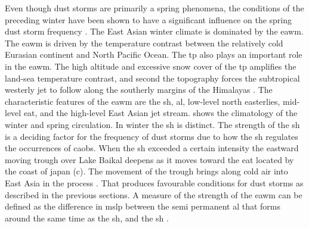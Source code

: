 Even though dust storms are primarily a spring phenomena, the conditions of the preceding winter have been shown to have a significant influence on the spring dust storm frequency \parencite{he2017impact, liu2018influence, gong2006simulated}. 
The East Asian winter climate is dominated by the \acrfull{eawm}. 
The \acrshort{eawm} is driven by the temperature contrast between the relatively cold Eurasian continent and North Pacific Ocean.
The \acrshort{tp} also plays an important role in the \acrshort{eawm}. 
The high altitude and excessive snow cover of the \acrshort{tp} amplifies the land-sea temperature contrast, and second the topography forces the subtropical westerly jet to follow along the southerly margins of the Himalayas \parencite{tada2016evolution}. 
The characteristic features of the \acrshort{eawm} are the \acrfull{sh}, \acrfull{al}, low-level north easterlies, mid-level \acrfull{eat}, and the high-level East Asian jet stream. 
 shows the climatology of the winter and spring  circulation. 
In winter the \acrshort{sh} is distinct. 
The strength of the \acrshort{sh} is a deciding factor for the frequency of dust storms due to how the \acrshort{sh} regulates the occurrences of \acrshort{caob}s.
When the \acrshort{sh} exceeded a certain intensity the eastward moving trough over Lake Baikal deepens as it moves toward the \acrshort{eat} located by the coast of japan (c). 
The movement of the trough brings along cold air into East Asia in the process \parencite{he2017impact}. 
That produces favourable conditions for dust storms as described in the previous sections. 
A measure of the strength of the \acrshort{eawm} can be defined as the difference in \acrshort{mslp} between the semi permanent \acrshort{al} that forms around the same time as the \acrshort{sh}, and the \acrshort{sh} \parencite{yoshiike2009influence}. 

